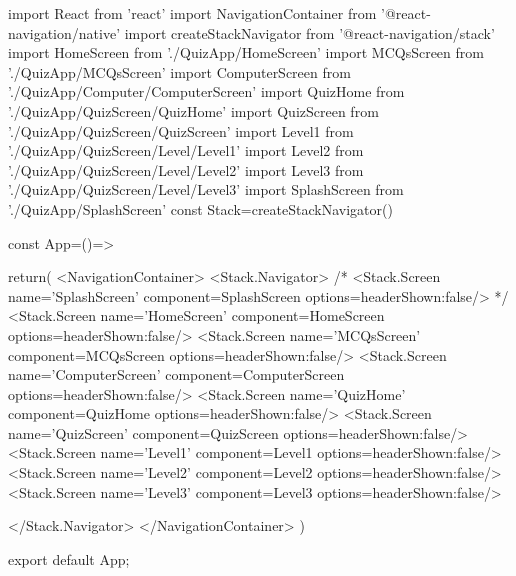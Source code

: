 import React from 'react'
import {NavigationContainer} from '@react-navigation/native'
import {createStackNavigator} from '@react-navigation/stack'
import HomeScreen from './QuizApp/HomeScreen'
import MCQsScreen from './QuizApp/MCQsScreen'
import ComputerScreen from './QuizApp/Computer/ComputerScreen'
import QuizHome from './QuizApp/QuizScreen/QuizHome'
import QuizScreen from './QuizApp/QuizScreen/QuizScreen'
import Level1 from './QuizApp/QuizScreen/Level/Level1'
import Level2 from './QuizApp/QuizScreen/Level/Level2'
import Level3 from './QuizApp/QuizScreen/Level/Level3'
import SplashScreen from './QuizApp/SplashScreen'
const Stack=createStackNavigator()

const App=()=>{
  return(
  <NavigationContainer>
    <Stack.Navigator>
      {/* <Stack.Screen name='SplashScreen' component={SplashScreen} options={{headerShown:false}}/> */}
      <Stack.Screen name='HomeScreen' component={HomeScreen} options={{headerShown:false}}/>
      <Stack.Screen name='MCQsScreen' component={MCQsScreen} options={{headerShown:false}}/>
      <Stack.Screen name='ComputerScreen' component={ComputerScreen} options={{headerShown:false}}/>
      <Stack.Screen name='QuizHome' component={QuizHome} options={{headerShown:false}}/>
      <Stack.Screen name='QuizScreen' component={QuizScreen} options={{headerShown:false}}/>
      <Stack.Screen name='Level1' component={Level1} options={{headerShown:false}}/>
      <Stack.Screen name='Level2' component={Level2} options={{headerShown:false}}/>
      <Stack.Screen name='Level3' component={Level3} options={{headerShown:false}}/>
  
    </Stack.Navigator>
  </NavigationContainer>
  )
}
export default App;